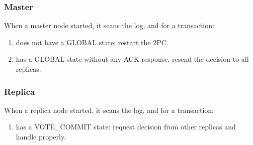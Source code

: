 \documentclass[11pt, oneside]{article}   	%
\begin{document}
\subsubsection{Master}
When a master node started, it scans the log, and for a transaction:
\begin{enumerate}
\item does not have a GLOBAL state: restart the 2PC.
\item has a GLOBAL state without any ACK response, resend the decision to all replicas.
\end{enumerate}
\subsubsection{Replica}
When a replica node started, it scans the log, and for a transaction:
\begin{enumerate}
\item has a VOTE\_COMMIT state: request decision from other replicas and handle properly.
\end{enumerate}
\end{document}
